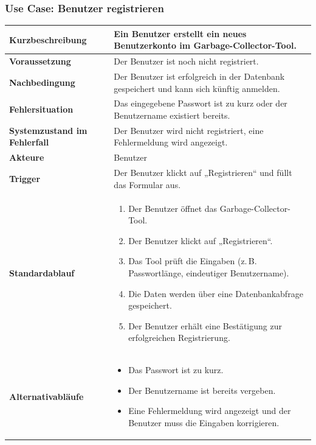 \subsubsection*{Use Case: Benutzer registrieren}
\begin{tabular}{|p{5cm}|p{10cm}|}
\hline
\textbf{Kurzbeschreibung} & Ein Benutzer erstellt ein neues Benutzerkonto im Garbage-Collector-Tool. \\
\hline
\textbf{Voraussetzung} & Der Benutzer ist noch nicht registriert. \\
\hline
\textbf{Nachbedingung} & Der Benutzer ist erfolgreich in der Datenbank gespeichert und kann sich künftig anmelden. \\
\hline
\textbf{Fehlersituation} & Das eingegebene Passwort ist zu kurz oder der Benutzername existiert bereits. \\
\hline
\textbf{Systemzustand im Fehlerfall} & Der Benutzer wird nicht registriert, eine Fehlermeldung wird angezeigt. \\
\hline
\textbf{Akteure} & Benutzer \\
\hline
\textbf{Trigger} & Der Benutzer klickt auf „Registrieren“ und füllt das Formular aus. \\
\hline
\textbf{Standardablauf} &
\begin{enumerate}
    \item Der Benutzer öffnet das Garbage-Collector-Tool.
    \item Der Benutzer klickt auf „Registrieren“.
    \item Das Tool prüft die Eingaben (z.\,B. Passwortlänge, eindeutiger Benutzername).
    \item Die Daten werden über eine Datenbankabfrage gespeichert.
    \item Der Benutzer erhält eine Bestätigung zur erfolgreichen Registrierung.
\end{enumerate}
\\
\hline
\textbf{Alternativabläufe} &
\begin{itemize}
    \item Das Passwort ist zu kurz.
    \item Der Benutzername ist bereits vergeben.
    \item Eine Fehlermeldung wird angezeigt und der Benutzer muss die Eingaben korrigieren.
\end{itemize}
\\
\hline
\end{tabular}



